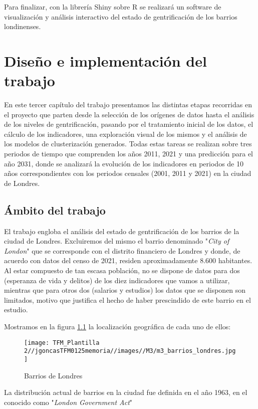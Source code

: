 \documentclass[12pt,a4paper,twoside]{book}
\begin{document}
Para finalizar, con la librería Shiny sobre R se realizará un software de visualización y análisis interactivo del estado de gentrificación de los barrios londinenses.

\chapter{Diseño e implementación del trabajo}

En este tercer capítulo del trabajo presentamos las distintas etapas recorridas en el proyecto que parten desde la selección de los orígenes de datos hasta el análisis de los niveles de gentrificación, pasando por el tratamiento inicial de los datos, el cálculo de los indicadores, una exploración visual de los mismos y el análisis de los modelos de clusterización generados. Todas estas tareas se realizan sobre tres periodos de tiempo que comprenden los años 2011, 2021 y una predicción para el año 2031, donde se analizará la evolución de los indicadores en periodos de 10 años correspondientes con los periodos censales (2001, 2011 y 2021) en la ciudad de Londres.

\section{Ámbito del trabajo}

El trabajo engloba el análisis del estado de gentrificación de los barrios de la ciudad de Londres. Excluiremos del mismo el barrio denominado "\textit{City of London}" que se corresponde con el distrito financiero de Londres y donde, de acuerdo con datos del censo de 2021, residen aproximadamente 8.600 habitantes. Al estar compuesto de tan escasa población, no se dispone de datos para dos (esperanza de vida y delitos) de los diez indicadores que vamos a utilizar, mientras que para otros dos (salarios y estudios) los datos que se disponen son limitados, motivo que justifica el hecho de haber prescindido de este barrio en el estudio.

Mostramos en la figura \ref{fig:m3_barrios_londres} la localización geográfica de cada uno de ellos:

\begin{figure}[H]
    \centering
    \texttt{[image: TFM\_Plantilla 2//jgoncasTFM0125memoria//images//M3/m3\_barrios\_londres.jpg]}
    \caption{Barrios de Londres}
    \label{fig:m3_barrios_londres}
\end{figure}

La distribución actual de barrios en la ciudad fue definida en el año 1963, en el conocido como "\textit{London Government Act}" \cite{participation_london_nodate}
\end{document}
